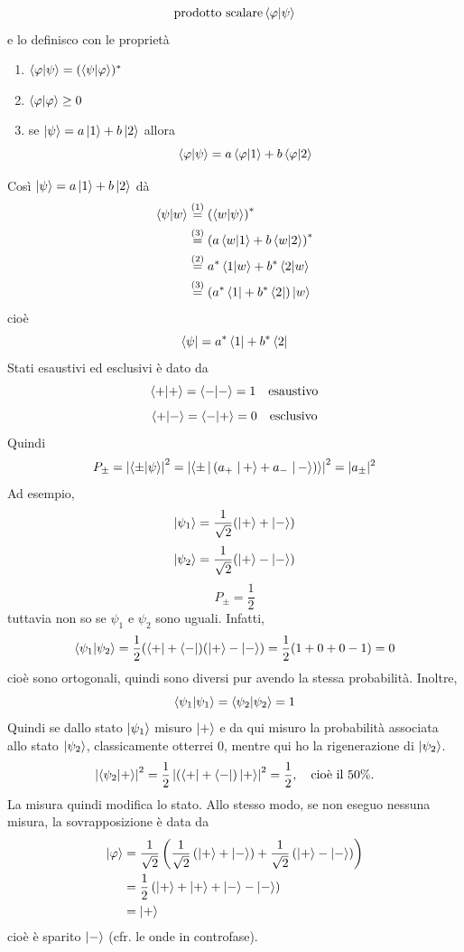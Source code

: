 \[
  \text{prodotto scalare} \braket{\varphi|\psi}
\]
e lo definisco con le proprietà
\begin{enumerate}
  \item \(\braket{\varphi|\psi} = (\braket{\psi|\varphi})^*\)
  \item \(\braket{\varphi|\varphi} \geq 0\)
  \item se \(\ket{\psi} = a \ket{1} + b \ket{2}\) allora
    \[
      \braket{\varphi|\psi} = a \braket{\varphi|1} + b \braket{\varphi|2}
    \]
\end{enumerate}
Così \(\ket{\psi} = a \ket{1} + b \ket{2}\) dà
\begin{align*}
  \braket{\psi|w}
  &\stackrel{(1)}{=} \left( \braket{w|\psi} \right)^* \\
  &\stackrel{(3)}{=} \left( a \braket{w|1} + b \braket{w|2} \right)^* \\
  &\stackrel{(2)}{=} a^* \braket{1|w} + b^* \braket{2|w} \\
  &\stackrel{(3)}{=} \left( a^* \bra{1} + b^* \bra{2} \right) \ket{w}
\end{align*}
cioè
\[
  \bra{\psi} = a^* \bra{1} + b^* \bra{2}
\]
Stati esaustivi ed esclusivi è dato da
\[
  \braket{+|+} = \braket{-|-}  = 1 \quad \text{esaustivo}
\]
\[
  \braket{+|-} = \braket{-|+} = 0 \quad \text{esclusivo}
\]
Quindi
\[
  P_\pm
  = \left| \braket{\pm|\psi} \right|^2
  = \left| \Braket{\pm|\left( a_+ \ket{+} + a_- \ket{-} \right)} \right|^2
  = |a_\pm|^2
\]
Ad esempio,
\[
  \ket{\psi_1} = \frac{1}{\sqrt{2}} (\ket{+} + \ket{-})
\]
\[
  \ket{\psi_2} = \frac{1}{\sqrt{2}} (\ket{+} - \ket{-})
\]
\[
  P_\pm = \frac{1}{2}
\]
tuttavia non so se \(\psi_1\) e \(\psi_2\) sono uguali. Infatti,
\[
  \braket{\psi_1|\psi_2}
  = \frac{1}{2} (\bra{+} + \bra{-})(\ket{+} - \ket{-})
  = \frac{1}{2} (1 + 0 + 0 - 1)
  = 0
\]
cioè sono ortogonali, quindi sono diversi pur avendo la stessa probabilità. Inoltre,
\[
  \braket{\psi_1|\psi_1} = \braket{\psi_2|\psi_2} = 1
\]
Quindi se dallo stato \(\ket{\psi_1}\) misuro \(\ket{+}\) e da qui misuro la probabilità associata allo stato \(\ket{\psi_2}\), classicamente otterrei 0, mentre qui ho la rigenerazione di \(\ket{\psi_2}\).
\[
  \left| \braket{\psi_2|+} \right|^2
  = \frac{1}{2} \left| \left( \bra{+} + \bra{-} \right) \ket{+} \right|^2
  = \frac{1}{2},
  \quad \text{cioè il 50\%}.
\]
La misura quindi modifica lo stato. Allo stesso modo, se non eseguo nessuna misura, la sovrapposizione è data da
\begin{align*}
  \ket{\varphi}
  &= \frac{1}{\sqrt{2}} \left(
    \frac{1}{\sqrt{2}} \left( \ket{+} + \ket{-} \right)
      + \frac{1}{\sqrt{2}} \left( \ket{+} - \ket{-} \right)
  \right) \\
  &= \frac{1}{2} \left( \ket{+} + \ket{+} + \ket{-} - \ket{-} \right) \\
  &= \ket{+}
\end{align*}
cioè è sparito \(\ket{-}\) (cfr. le onde in controfase).

